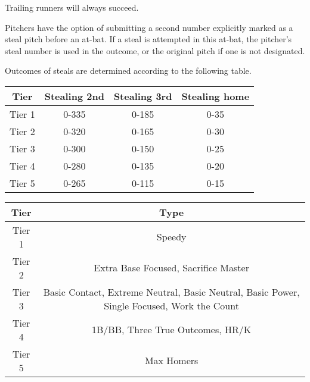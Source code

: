 \begin{deepEnumerate}
\begin{deepEnumerate}
\begin{deepEnumerate}
\begin{deepEnumerate}
				Trailing runners will always succeed.
			\end{deepEnumerate}
			\item Pitchers have the option of submitting a second number explicitly marked as a steal pitch before an at-bat. 
			If a steal is attempted in this at-bat, the pitcher’s steal number is used in the outcome, 
			or the original pitch if one is not designated.
		\end{deepEnumerate}
		\pagebreak %
		\item Outcomes of steals are determined according to the following table.
		\begin{center}
			\begin{tabular}{|c|c|c|c|}
				\hline
				\textbf{Tier} & \textbf{Stealing 2nd}  & \textbf{Stealing 3rd}  & \textbf{Stealing home}                                              \\
				\hline 
				Tier 1   	 & 0-335                          & 0-185                          & 0-35 \\
				\hline
				Tier 2    	 & 0-320                          & 0-165                          & 0-30 \\
				\hline
				Tier 3   	 & 0-300                          & 0-150                          & 0-25 \\
				\hline
				Tier 4   	 & 0-280                          & 0-135                          & 0-20 \\
				\hline
				Tier 5   	 & 0-265                          & 0-115                          & 0-15 \\
				\hline
			\end{tabular}
			\begin{tabular}{|c|c|}
				\hline
				\textbf{Tier} & \textbf{Type}                                           		\\
				\hline 
				Tier 1   	 & Speedy \\
				\hline
				Tier 2    	 & Extra Base Focused, Sacrifice Master\\
				\hline
				Tier 3   	 &Basic Contact, Extreme Neutral, Basic Neutral, Basic Power, Single Focused, Work the Count \\
				\hline
				Tier 4   	 & 1B/BB, Three True Outcomes, HR/K \\
				\hline
				Tier 5   	 & Max Homers \\
				\hline
			\end{tabular}
			

\end{center}
\end{deepEnumerate}
\end{deepEnumerate}
